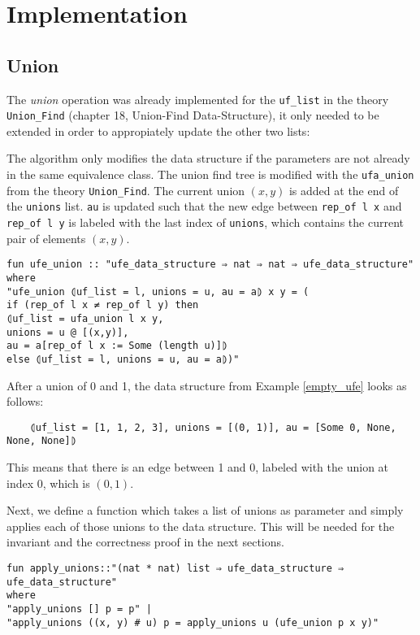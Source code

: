 \section{Implementation}

\subsection{Union}

The \emph{union} operation was already implemented for the \lstinline{uf_list} in the theory \lstinline{Union_Find} \cite{Sep} (chapter 18, Union-Find Data-Structure), it only needed to be extended in order to appropiately update the other two lists:

The algorithm only modifies the data structure if the parameters are not already in the same equivalence class.
The union find tree is modified with the \lstinline{ufa_union} from the theory \lstinline{Union_Find}\cite{Sep}.
The current union $(x, y)$ is added at the end of the \lstinline{unions} list.
\lstinline{au} is updated such that the new edge between \lstinline{rep_of l x} and \lstinline{rep_of l y} is labeled with the last index of \lstinline{unions}, which contains the current pair of elements $(x, y)$. 

\begin{lstlisting}
fun ufe_union :: "ufe_data_structure ⇒ nat ⇒ nat ⇒ ufe_data_structure"
where
"ufe_union ⦇uf_list = l, unions = u, au = a⦈ x y = (
if (rep_of l x ≠ rep_of l y) then
⦇uf_list = ufa_union l x y, 
unions = u @ [(x,y)],
au = a[rep_of l x := Some (length u)]⦈
else ⦇uf_list = l, unions = u, au = a⦈)"
\end{lstlisting}

\begin{exmp}
After a union of 0 and 1, the data structure from Example \ref{empty_ufe} looks as follows:
\begin{lstlisting}
	⦇uf_list = [1, 1, 2, 3], unions = [(0, 1)], au = [Some 0, None, None, None]⦈
\end{lstlisting}
This means that there is an edge between 1 and 0, labeled with the union at index 0, which is $(0,1)$.
\end{exmp}

Next, we define a function which takes a list of unions as parameter and simply applies each of those unions to the data structure. This will be needed for the invariant and the correctness proof in the next sections.

\begin{lstlisting}
fun apply_unions::"(nat * nat) list ⇒ ufe_data_structure ⇒ ufe_data_structure"
where
"apply_unions [] p = p" |
"apply_unions ((x, y) # u) p = apply_unions u (ufe_union p x y)"
\end{lstlisting}

